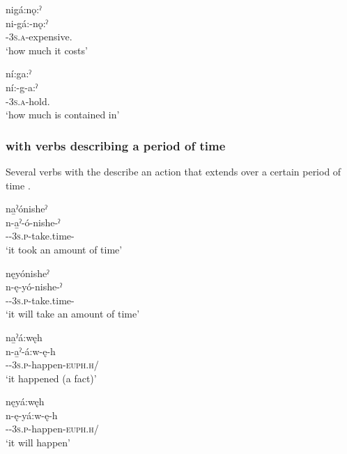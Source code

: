 \ex nigá:nǫ:ˀ\\
\gll ni-gá:-nǫ:ˀ\\
{\partitive}-\textsc{3s.a}-expensive.{\stative}\\
\glt `how much it costs'

\ex ní:ga:ˀ\\
\gll ní:-g-a:ˀ\\
{\partitive}-\textsc{3s.a}-hold.{\stative}\\
\glt `how much is contained in'
\z
\z



\subsubsection*{ \textsc{\partitive} with verbs describing a period of time} \label{[ni-] (partitive) with verbs describing a period of time}
Several verbs with the  \textsc{\partitive} describe an action that extends over a certain period of time .

\ea\label{ex:niex3}

\ea na̱ˀónisheˀ\\
\gll n-a̱ˀ-ó-nishe-ˀ\\
{\partitive}-{\factual}-\textsc{3s.p}-take.time-{\punctual}\\
\glt `it took an amount of time'

\ea nęyónisheˀ\\
\gll n-ę-yó-nishe-ˀ\\
{\partitive}-{\future}-\textsc{3s.p}-take.time-{\punctual}\\
\glt `it will take an amount of time'
\z

\ex na̱ˀá:węh\\
\gll n-a̱ˀ-á:w-ę-h\\
{\partitive}-{\factual}-\textsc{3s.p}-happen-\textsc{euph.h}/{\zeropunctual}\\
\glt `it happened (a fact)'

\ea nęyá:węh\\
\gll n-ę-yá:w-ę-h\\
{\partitive}-{\future}-\textsc{3s.p}-happen-\textsc{euph.h}/{\zeropunctual}\\
\glt `it will happen'

